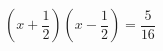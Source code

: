 \begin{ex}
	\begin{condition}
		\( \left(x+\dfrac{1}{2}\right)\left(x-\dfrac{1}{2}\right)=\dfrac{5}{16} \)
	\end{condition}
\end{ex}